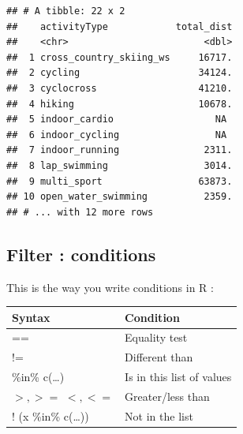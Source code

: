 \documentclass[
]{book}
\newenvironment{Shaded}{\begin{snugshade}}{\end{snugshade}}
\newcommand{\CommentTok}[1]{\textcolor[rgb]{0.56,0.35,0.01}{\textit{#1}}}
\newcommand{\DataTypeTok}[1]{\textcolor[rgb]{0.13,0.29,0.53}{#1}}
\newcommand{\DecValTok}[1]{\textcolor[rgb]{0.00,0.00,0.81}{#1}}
\newcommand{\KeywordTok}[1]{\textcolor[rgb]{0.13,0.29,0.53}{\textbf{#1}}}
\newcommand{\NormalTok}[1]{#1}
\newcommand{\OperatorTok}[1]{\textcolor[rgb]{0.81,0.36,0.00}{\textbf{#1}}}
\newcommand{\StringTok}[1]{\textcolor[rgb]{0.31,0.60,0.02}{#1}}
\begin{document}
\begin{Shaded}
\end{Shaded}

\begin{verbatim}
## # A tibble: 22 x 2
##    activityType            total_dist
##    <chr>                        <dbl>
##  1 cross_country_skiing_ws     16717.
##  2 cycling                     34124.
##  3 cyclocross                  41210.
##  4 hiking                      10678.
##  5 indoor_cardio                  NA 
##  6 indoor_cycling                 NA 
##  7 indoor_running               2311.
##  8 lap_swimming                 3014.
##  9 multi_sport                 63873.
## 10 open_water_swimming          2359.
## # ... with 12 more rows
\end{verbatim}

\hypertarget{filter-conditions}{%
\subsection{Filter : conditions}\label{filter-conditions}}

This is the way you write conditions in R :

\begin{longtable}[]{@{}ll@{}}
\toprule
Syntax & Condition\tabularnewline
\midrule
\endhead
== & Equality test\tabularnewline
!= & Different than\tabularnewline
\%in\% c(\ldots) & Is in this list of values\tabularnewline
\(>, >=\) \(<, <=\) & Greater/less than\tabularnewline
! (x \%in\% c(\ldots)) & Not in the list\tabularnewline
\bottomrule
\end{longtable}
\end{document}
